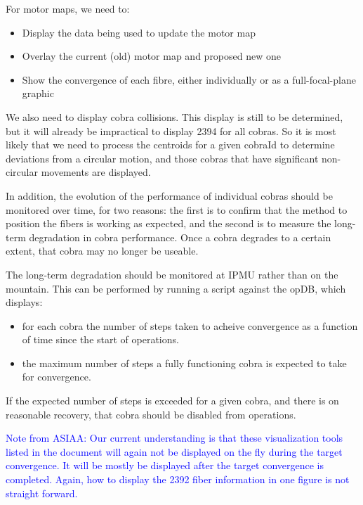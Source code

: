 \documentclass[12pt]{article}
\newcommand{\opDB}{\gls{opDB}\xspace}
\begin{document}
For motor maps, we need to:

\begin{itemize}
\item Display the data being used to update the \gls{motor map}
\item Overlay the current (old) \gls{motor map} and proposed new one
\item Show the convergence of each fibre, either individually or as a full-focal-plane graphic
\end{itemize}

We also need to display cobra collisions. This display is still to be determined, but it will already be impractical
to display 2394 for all cobras. So it is most likely that we need to process the centroids for a given cobraId 
to determine deviations from a circular motion, and those cobras that have significant non-circular movements
are displayed.


In addition, the evolution of the performance of individual cobras should be monitored over time, for two reasons:
the first is to confirm that the method to position the fibers is working as expected, and the second is to measure
the long-term degradation in cobra performance. Once a cobra degrades to a certain extent, that cobra may no longer be useable. 


The long-term degradation should be monitored at IPMU rather than on the mountain.
This can be performed by running a script against the \opDB, 
which displays:

\begin{itemize}
\item for each cobra the number of steps taken to acheive convergence as
a function of time since the start of operations.
\item the maximum number of steps a fully functioning cobra is expected to take for convergence.
\end{itemize}

If the expected number of steps is exceeded for a given cobra, and there is on reasonable recovery, 
that cobra should be disabled from operations.

\textcolor{blue}{ Note from ASIAA: 
Our current understanding is that these visualization tools listed in
the document will again not be displayed on the fly during the target
convergence. It will be mostly be displayed after the target
convergence is completed. Again, how to display the 2392 fiber
information in one figure is not straight forward.
}
\end{document}
